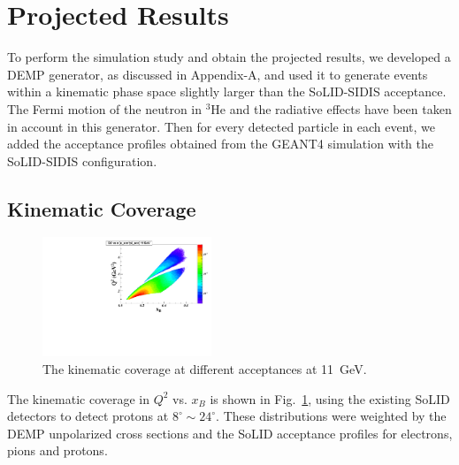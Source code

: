 \section{Projected Results}

To perform the simulation study and obtain the projected results, we developed
a DEMP generator, as discussed in Appendix-A, and used it to generate events
within a kinematic phase space slightly larger than the SoLID-SIDIS acceptance.
The
Fermi motion of the neutron in $\mathrm{^{3}He}$ and the radiative effects have
been taken in account in this generator.  Then for every detected
particle in each event, we added the acceptance profiles obtained from the
GEANT4 simulation with the SoLID-SIDIS configuration.

\subsection{Kinematic Coverage}
\begin{figure}[!ht]
 \begin{center}
      \includegraphics[type=pdf,
        ext=.pdf,read=.pdf,width=0.45\textwidth]{./figures//E11_Q2_x_epip}
  
   \caption[The kinematic coverage at different acceptances.]{\footnotesize{The
kinematic coverage at different acceptances at 11~GeV.}}
  \label{kin_cor}
  \end{center}
\end{figure}
The kinematic coverage in $Q^{2}$ vs. $x_{B}$ is shown in Fig.~\ref{kin_cor},
using the existing SoLID detectors to detect protons at
$8^{\circ}\sim24^{\circ}$. These distributions were
weighted by the DEMP unpolarized cross sections and the SoLID acceptance profiles for electrons, pions and protons.

